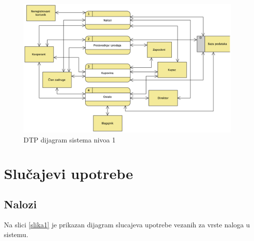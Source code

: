 \documentclass[a4paper]{article}
\begin{document}
\begin{figure}[h!]
    \centering
    \includegraphics[scale=0.5]{images/dtp_nivo_1.png}
    \caption{DTP dijagram sistema nivoa 1}
    \label{dtp_nivo_1}
\end{figure}

\newpage

\section{Slučajevi upotrebe}

\subsection{Nalozi}
Na slici %
\ref{slika1} je prikazan dijagram slucajeva upotrebe vezanih za vrste naloga u sistemu.


\end{document}
